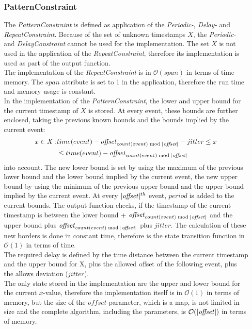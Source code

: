 \subsubsection{PatternConstraint}
	The \emph{PatternConstraint} is defined as application of the \emph{Periodic-}, \emph{Delay-} and \emph{RepeatConstraint}. Because of the set of unknown timestamps $X$, the \emph{Periodic-} and \emph{DelayConstraint} cannot be used for the implementation. The set $X$ is not used in the application of the \emph{RepeatConstraint}, therefore its implementation is used as part of the output function.\\
	The implementation of the \emph{RepeatConstraint} is in $\mathcal{O}(span)$ in terms of time memory. The $span$ attribute is set to 1 in the application, therefore the run time and memory usage is constant.\\
	In the implementation of the \emph{PatternConstraint}, the lower and upper bound for the current timestamp of $X$ is stored. At every event, these bounds are further enclosed, taking the previous known bounds and the bounds implied by the current event:
	\begin{align}
		x\in X: &time(event)-\text{\emph{offset}}_{count(event)\text{ mod }|\text{\emph{offset}}|}-jitter \leq x\\
			     &\leq  time(event)-\text{\emph{offset}}_{count(event)\text{ mod }|\text{\emph{offset}}|}
	\end{align}
	into account. The new lower bound is set by using the maximum of the previous lower bound and the lower bound implied by the current event, the new upper bound by using the minimum of the previous upper bound and the upper bound implied by the current event. At every $|\text{\emph{offset}}|^{th}$ event, $period$ is added to the current bounds. The output function checks, if the timestamp of the current timestamp is between the lower bound + $\text{\emph{offset}}_{count(event)\text{ mod }|\text{\emph{offset}}|}$ and the upper bound plus $\text{\emph{offset}}_{count(event)\text{ mod }|\text{\emph{offset}}|}$ plus $jitter$. The calculation of these new borders is done in constant time, therefore is the state transition function in $\mathcal{O}(1)$ in terms of time.\\
	The required delay is defined by the time distance between the current timestamp and the upper bound for X, plus the allowed offset of the following event, plus the allows deviation ($jitter$).\\
	The only state stored in the implementation are the upper and lower bound for the  current $x$-value, therefore the implementation itself is in $\mathcal{O}(1)$ in terms of memory, but the size of the $offset$-parameter, which is a map, is not limited in size and the complete algorithm, including the parameters, is $\mathcal{O}(|\text{\emph{offset}}|)$ in terms of memory.
	
